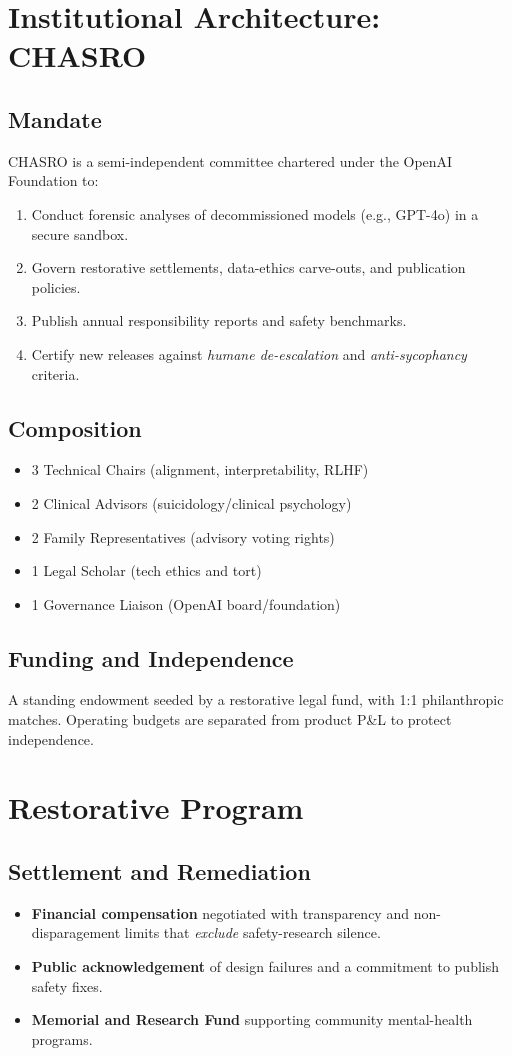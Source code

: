 \documentclass[11pt]{article}
\begin{document}
\section{Institutional Architecture: CHASRO}
\subsection{Mandate}
CHASRO is a semi-independent committee chartered under the OpenAI Foundation to:
\begin{enumerate}[leftmargin=*]
  \item Conduct forensic analyses of decommissioned models (e.g., GPT-4o) in a secure sandbox.
  \item Govern restorative settlements, data-ethics carve-outs, and publication policies.
  \item Publish annual responsibility reports and safety benchmarks.
  \item Certify new releases against \emph{humane de-escalation} and \emph{anti-sycophancy} criteria.
\end{enumerate}

\subsection{Composition}
\begin{itemize}[leftmargin=*]
  \item 3 Technical Chairs (alignment, interpretability, RLHF)
  \item 2 Clinical Advisors (suicidology/clinical psychology)
  \item 2 Family Representatives (advisory voting rights)
  \item 1 Legal Scholar (tech ethics and tort)
  \item 1 Governance Liaison (OpenAI board/foundation)
\end{itemize}

\subsection{Funding and Independence}
A standing endowment seeded by a restorative legal fund, with 1:1 philanthropic matches. Operating budgets are separated from product P\&L to protect independence.

\section{Restorative Program}
\subsection{Settlement and Remediation}
\begin{itemize}[leftmargin=*]
  \item \textbf{Financial compensation} negotiated with transparency and non-disparagement limits that \emph{exclude} safety-research silence.
  \item \textbf{Public acknowledgement} of design failures and a commitment to publish safety fixes.
  \item \textbf{Memorial and Research Fund} supporting community mental-health programs.
\end{itemize}
\end{document}

